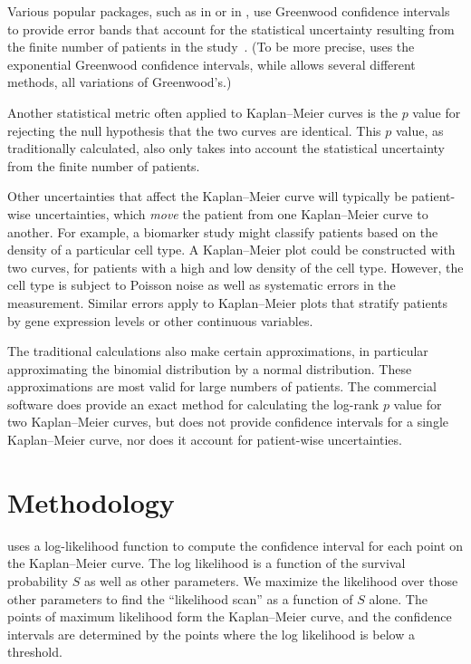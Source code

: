 \documentclass[article]{jss}
\newcommand{\KM}{Kaplan--Meier} %
\begin{document}
Various popular packages, such as  \citep{survival-package} in  \citep{R} or  \citep{lifelines} in , use Greenwood confidence intervals to provide error bands that account for the statistical uncertainty resulting from the finite number of patients in the study~\citep{GreenwoodNotes,Greenwood}. (To be more precise,  uses the exponential Greenwood confidence intervals, while  allows several different methods, all variations of Greenwood's.)

Another statistical metric often applied to \KM{} curves is the \(p\) value for rejecting the null hypothesis that the two curves are identical. This \(p\) value, as traditionally calculated, also only takes into account the statistical uncertainty from the finite number of patients.

Other uncertainties that affect the \KM{} curve will typically be patient-wise uncertainties, which \emph{move} the patient from one \KM{} curve to another. For example, a biomarker study might classify patients based on the density of a particular cell type. A \KM{} plot could be constructed with two curves, for patients with a high and low density of the cell type. However, the cell type is subject to Poisson noise as well as systematic errors in the measurement. Similar errors apply to \KM{} plots that stratify patients by gene expression levels or other continuous variables.

The traditional calculations also make certain approximations, in particular approximating the binomial distribution by a normal distribution. These approximations are most valid for large numbers of patients. The commercial software  \citep{StatXact} does provide an exact method for calculating the log-rank \(p\) value for two \KM{} curves, but does not provide confidence intervals for a single \KM{} curve, nor does it account for patient-wise uncertainties.

\section{Methodology}\label{sec:methodology}

 uses a log-likelihood function to compute the confidence interval for each point on the \KM{} curve. The log likelihood is a function of the survival probability \(S\) as well as other parameters. We maximize the likelihood over those other parameters to find the ``likelihood scan'' as a function of \(S\) alone. The points of maximum likelihood form the \KM{} curve, and the confidence intervals are determined by the points where the log likelihood is below a threshold.
\end{document}
